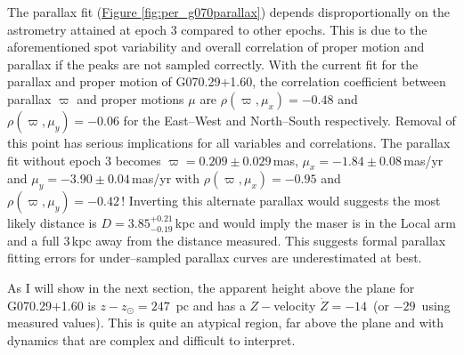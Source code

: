             The parallax fit (\hyperref[fig:per_g070parallax]{Figure \ref*{fig:per_g070parallax}}) depends disproportionally on the astrometry attained at epoch 3 compared to other epochs. This is due to the aforementioned spot variability and overall correlation of proper motion and parallax if the peaks are not sampled correctly. With the current fit for the parallax and proper motion of G070.29$+$1.60, the correlation coefficient between parallax $\varpi$ and proper motions $\mu$ are $\rho\left(\varpi,\mu_x\right)=-0.48$ and $\rho\left(\varpi,\mu_y\right)=-0.06$ for the East--West and North--South respectively. Removal of this point has serious implications for all variables and correlations. The parallax fit without epoch 3 becomes $\varpi=0.209\pm0.029$\,mas, $\mu_x=-1.84\pm0.08$\,mas/yr and $\mu_y=-3.90\pm0.04$\,mas/yr with $\rho\left(\varpi,\mu_x\right)=-0.95$ and $\rho\left(\varpi,\mu_y\right)=-0.42$\,! Inverting this alternate parallax would suggests the most likely distance is $D=3.85^{+0.21}_{-0.19}$\,kpc and would imply the maser is in the Local arm and a full 3\,kpc away from the distance measured. This suggests formal parallax fitting errors for under--sampled parallax curves are underestimated at best. 
			
			As I will show in the next section, the apparent height above the plane for G070.29$+$1.60 is $z-z_\odot=247$~pc and has a $Z-$velocity $\dot{Z}=-14$~\kms (or $-29$~\kms using measured values). This is quite an atypical region, far above the plane and with dynamics that are complex and difficult to interpret.
			
		\clearpage
